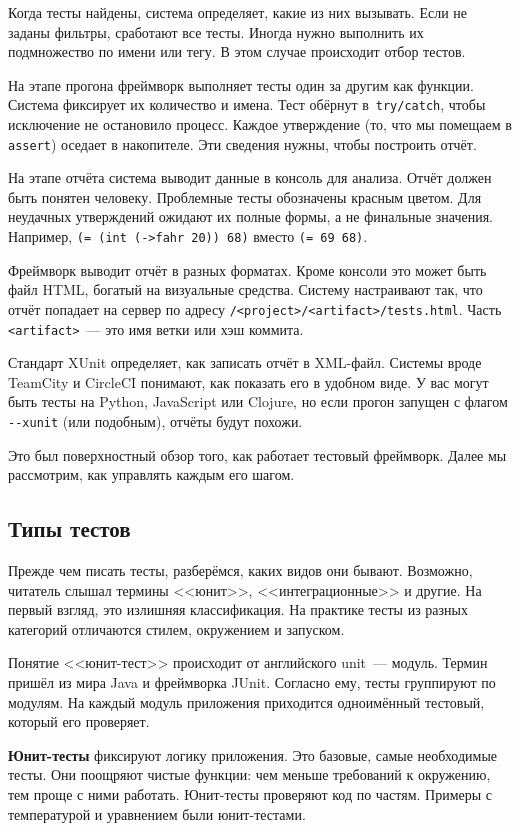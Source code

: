 Когда тесты найдены, система определяет, какие из них вызывать. Если не заданы
фильтры, сработают все тесты. Иногда нужно выполнить их подмножество по имени
или тегу. В этом случае происходит отбор тестов.

На этапе прогона фреймворк выполняет тесты один за другим как функции. Система
фиксирует их количество и имена. Тест обёрнут в~\verb|try/catch|, чтобы
исключение не остановило процесс. Каждое утверждение (то, что мы помещаем в
\verb|assert|) оседает в накопителе. Эти сведения нужны, чтобы построить отчёт.

На этапе отчёта система выводит данные в консоль для анализа. Отчёт должен быть
понятен человеку. Проблемные тесты обозначены красным цветом. Для неудачных
утверждений ожидают их полные формы, а не финальные значения. Например,
\verb|(= (int (->fahr 20)) 68)| вместо \verb|(= 69 68)|.

Фреймворк выводит отчёт в разных форматах. Кроме консоли это может быть файл
HTML, богатый на визуальные средства. Систему настраивают так, что отчёт
попадает на сервер по адресу \texttt{/<project>/<arti\-fact>/tests.html}. Часть
\verb|<artifact>|~--- это имя ветки или хэш коммита.

Стандарт XUnit определяет, как записать отчёт в XML-файл. Системы вроде TeamCity
и CircleCI понимают, как показать его в удобном виде. У вас могут быть тесты на
Python, JavaScript или Clojure, но если прогон запущен с флагом \verb|--xunit|
(или подобным), отчёты будут похожи.

Это был поверхностный обзор того, как работает тестовый фреймворк. Далее мы
рассмотрим, как управлять каждым его шагом.

\subsection{Типы тестов}


Прежде чем писать тесты, разберёмся, каких видов они бывают. Возможно, читатель
слышал термины <<юнит>>, <<интеграционные>> и другие. На первый взгляд, это
излишняя классификация. На практике тесты из разных категорий отличаются стилем,
окружением и запуском.

Понятие <<юнит-тест>> происходит от английского unit~--- модуль. Термин пришёл
из мира Java и фреймворка JUnit. Согласно ему, тесты группируют по модулям. На
каждый модуль приложения приходится одноимённый тестовый, который его проверяет.

\textbf{Юнит-тесты} фиксируют логику приложения. Это базовые, самые необходимые
тесты. Они поощряют чистые функции: чем меньше требований к окружению, тем проще
с ними работать. Юнит-тесты проверяют код по частям. Примеры с температурой и
уравнением были юнит-тестами.

